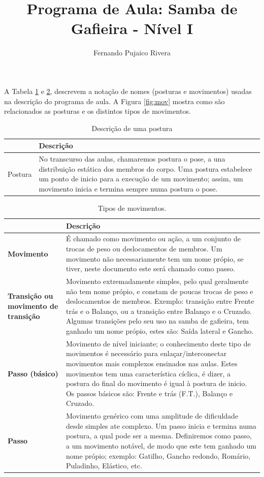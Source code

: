 \documentclass{article}
\title{Programa de Aula: Samba de Gafieira - Nível I}
\author{Fernando Pujaico Rivera}
\date{}
\begin{document}
{\let\newpage\relax\maketitle}
A Tabela \ref{tab:typospos} e \ref {tab:typosmov}, descrevem a notação de nomes  (posturas e movimentos) usadas 
na descrição do programa de aula.
A Figura \ref{fig:mov} mostra como são relacionados as posturas e os distintos tipos de movimentos.


\begin{table}[h]
\centering
\begin{tabular}{|p{3cm}|p{13cm}|}
\hline
~ & Descrição \\  \hline
Postura & No transcurso das aulas, chamaremos postura o pose, a una distribuição estática
dos membros do corpo. Uma postura estabelece um ponto de inicio para a execução de um
movimento; assim, um movimento inicia e termina sempre numa postura o pose.\\ \hline

\end{tabular}
\caption{Descrição de uma postura}
\label{tab:typospos}
\end{table}


\begin{table}[h]
\centering
\begin{tabular}{|p{2.5cm}|p{13.5cm}|}
\hline
~ & Descrição \\  \hline
\textbf{Movimento} & É chamado como movimento ou ação, a um conjunto de trocas de peso ou deslocamentos de membros.
Um movimento não necessariamente tem um nome própio, se tiver, neste documento este será
chamado como passo.\\ \hline
\textbf{Transição ou movimento de transição} &  Movimento extremadamente simples, pelo qual geralmente não tem nome própio,
e constam de poucas trocas de peso e deslocamentos de membros. Exemplo: transição entre Frente trás e o Balanço, 
ou a transição entre Balanço e o Cruzado. Algumas transições
pelo seu uso na samba de gafieira, tem ganhado um nome própio, estes são: Saída lateral e Gancho.\\ \hline
\textbf{Passo (básico)} & Movimento de nível iniciante; o conhecimento deste tipo de
movimentos é necessário para enlaçar/interconectar movimentos mais complexos ensinados nas aulas. Estes
movimentos tem uma característica cíclica, é dizer, a postura do final do movimento 
é igual à postura de inicio. Os passos básicos são: Frente e trás (F.T.), Balanço e Cruzado.\\ \hline
\textbf{Passo} &  Movimento genérico com uma amplitude de dificuldade desde simples ate complexo.
Um passo inicia e termina numa postura, a qual pode ser a mesma. Definiremos como passo, a um movimento
notável, de modo que este tem ganhado um nome própio; exemplo: Gatilho, Gancho redondo, Romário, Puladinho, Elástico, etc. \\ \hline

\end{tabular}
\caption{Tipos de movimentos.}
\label{tab:typosmov}
\end{table}
\end{document}
